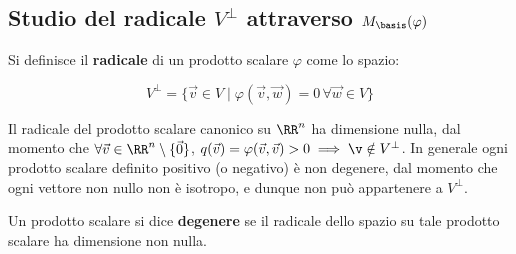 \subsection{Studio del radicale \texorpdfstring{$V^\perp$}{V⟂} attraverso \texorpdfstring{$M_\basis(\varphi)$}{M\_B(φ)}}

\begin{definition}
	Si definisce il \textbf{radicale} di un prodotto scalare $\varphi$ come lo spazio:
	
	\[ V^\perp = \{ \vec{v} \in V \mid \varphi(\vec{v}, \vec{w}) = 0 \, \forall \vec{w} \in V \} \]
	
	\vskip 0.05in
\end{definition}

\begin{remark}
	Il radicale del prodotto scalare canonico su $\RR^n$ ha dimensione nulla, dal momento che $\forall \vec{v} \in \RR^n \setminus \{\vec{0}\}$, $q(\vec{v}) = \varphi(\vec{v}, \vec{v}) > 0 \implies \v \notin V^\perp$. In
	generale ogni prodotto scalare definito positivo (o negativo) è non degenere, dal momento che ogni vettore
	non nullo non è isotropo, e dunque non può appartenere a $V^\perp$.
\end{remark}

\begin{definition}
	Un prodotto scalare si dice \textbf{degenere} se il radicale dello spazio su tale prodotto scalare ha
	dimensione non nulla.
\end{definition}

